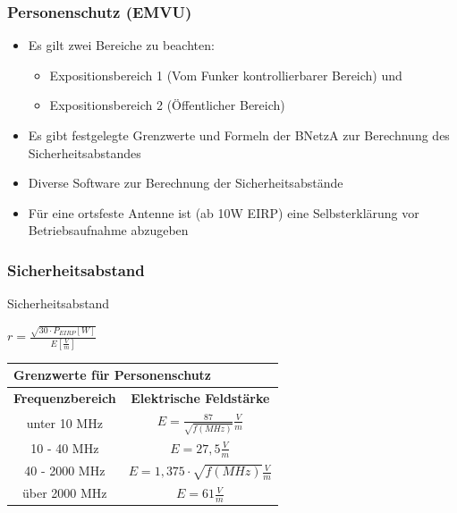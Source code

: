 \begin{frame}
	\frametitle{Personenschutz (EMVU)}
	\begin{itemize}
		\item Es gilt zwei Bereiche zu beachten:
			\begin{itemize}
				\item Expositionsbereich 1 (Vom Funker kontrollierbarer Bereich) und 
				\item Expositionsbereich 2 (Öffentlicher Bereich)
			\end{itemize}
		\item Es gibt festgelegte Grenzwerte und Formeln der BNetzA zur Berechnung des Sicherheitsabstandes
		\item Diverse Software zur Berechnung der Sicherheitsabstände
		\item Für eine ortsfeste Antenne ist (ab 10W EIRP) eine Selbsterklärung vor Betriebsaufnahme abzugeben
	\end{itemize}
\end{frame}

\begin{frame}
	\frametitle{Sicherheitsabstand}
	\begin{block}{Sicherheitsabstand}
	\begin{LARGE}
		$r = \frac{\sqrt{30 \cdot P_{EIRP}[W]}}{E[\frac{V}{m}]}$
	\end{LARGE}
	\end{block}
	\vspace{0.5cm}
	
	\begin{center}
	\begin{tabular}{|c|c|}
	\hline
	\multicolumn{2}{|l|}{\textbf{Grenzwerte für Personenschutz}} \\ \hline
	\textbf{Frequenzbereich} & \textbf{Elektrische Feldstärke} \\ \hline
	unter 10 MHz & $E = \frac{87}{\sqrt{f(MHz)}} \frac{V}{m}$ \\ \hline
	10 - 40 MHz & $E = 27,5 \frac{V}{m}$ \\ \hline
	40 - 2000 MHz & $E = 1,375 \cdot \sqrt{f(MHz)} \frac{V}{m}$ \\ \hline
	über 2000 MHz & $E = 61 \frac{V}{m}$ \\ \hline
	\end{tabular}
	\end{center}
\end{frame}

